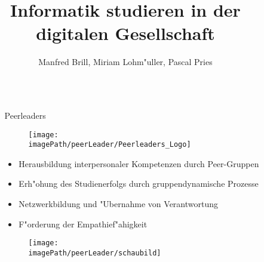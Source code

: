 \documentclass[final,hyperref={pdfpagelabels=false}]{beamer}
\title{\huge Informatik studieren in der digitalen Gesellschaft} %
\author{Manfred Brill, Miriam Lohm"uller, Pascal Pries} %
\institute{Hochschule Kaiserslautern Fachbereich Informatik und Mikrosystemtechnik} %
\newcommand{\imagePath}{../../../images}
\begin{document}

\begin{frame}[t] %

\begin{columns}[t] %

\begin{column}{.02\textwidth}\end{column} %

\begin{column}{.465\textwidth} %


\begin{block}{Peerleaders}

    \vspace{40px}

    \begin{figure}
        \texttt{[image: \\imagePath/peerLeader/Peerleaders\_Logo]}
    \end{figure}

    \begin{itemize}
        \item Herausbildung interpersonaler Kompetenzen durch Peer-Gruppen
        \item Erh"ohung des Studienerfolgs durch gruppendynamische Prozesse
        \item Netzwerkbildung und  "Ubernahme von Verantwortung
        \item F"orderung der Empathief"ahigkeit
    \end{itemize}

        \vspace{20px}
    \begin{figure}
        \texttt{[image: \\imagePath/peerLeader/schaubild]}
    \end{figure}
    \vspace{40px}



\end{block}
\end{column}
\end{columns}
\end{frame}
\end{document}
